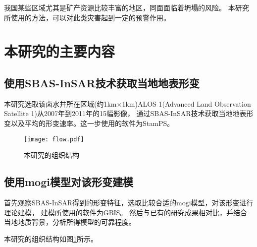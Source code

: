 我国某些区域尤其是矿产资源比较丰富的地区，同面面临着坍塌的风险。
本研究所使用的方法，可以对此类灾害起到一定的预警作用。

\section{本研究的主要内容}

\subsection{使用SBAS-InSAR技术获取当地地表形变}
本研究选取该卤水井所在区域(约1km×1km)ALOS 1(Advanced Land Observation Satellite 1)从2007年到2011年的15幅影像，
通过SBAS-InSAR技术获取当地地表形变以及平均的形变速率。这一步使用的软件为StamPS。
\begin{figure}[htb]
  \centering
  \texttt{[image: flow.pdf]}
  \caption{本研究的组织结构}
  \label{fig:flow}
\end{figure}

\subsection{使用mogi模型对该形变建模}
首先观察SBAS-InSAR得到的形变特征，选取比较合适的mogi模型，对该形变进行理论建模，
建模所使用的软件为GBIS。
然后与已有的研究成果相对比，并结合当地地质背景，分析所得模型的可靠程度。

本研究的组织结构如图\ref{fig:flow}所示。